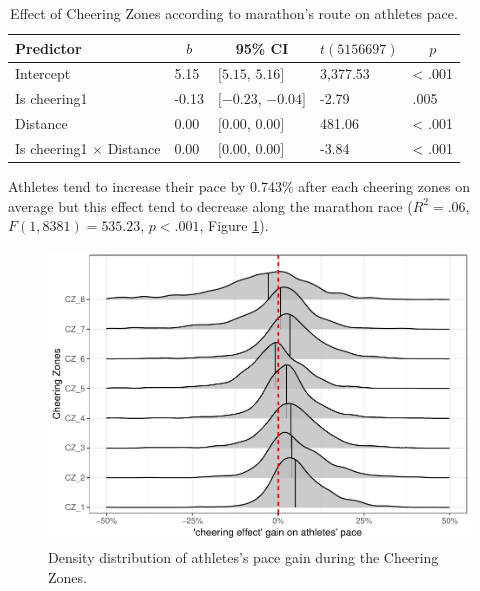 \documentclass[,man]{apa6}
\theoremstyle{definition}
\theoremstyle{definition}
\theoremstyle{definition}
\theoremstyle{remark}
\begin{document}
\begin{table}[tbp]
\begin{center}
\begin{threeparttable}
\caption{\label{tab:table_ischeering}Effect of Cheering Zones according to marathon's route on athletes pace.}
\begin{tabular}{lllll}
\toprule
Predictor & \multicolumn{1}{c}{$b$} & \multicolumn{1}{c}{95\% CI} & \multicolumn{1}{c}{$t(5156697)$} & \multicolumn{1}{c}{$p$}\\
\midrule
Intercept & 5.15 & $[5.15$, $5.16]$ & 3,377.53 & < .001\\
Is cheering1 & -0.13 & $[-0.23$, $-0.04]$ & -2.79 & .005\\
Distance & 0.00 & $[0.00$, $0.00]$ & 481.06 & < .001\\
Is cheering1 $\times$ Distance & 0.00 & $[0.00$, $0.00]$ & -3.84 & < .001\\
\bottomrule
\end{tabular}
\end{threeparttable}
\end{center}
\end{table}

Athletes tend to increase their pace by 0.743\% after each cheering
zones on average but this effect tend to decrease along the marathon
race (\(R^2 = .06\), \(F(1, 8381) = 535.23\), \(p < .001\), Figure
\ref{fig:plot-pace-gain}).

\begin{figure}

{\centering \includegraphics{marathon_cheering_effect_files/figure-latex/plot-pace-gain-1} 

}

\caption{Density distribution of athletes's pace gain during the Cheering Zones.}\label{fig:plot-pace-gain}
\end{figure}
\end{document}

